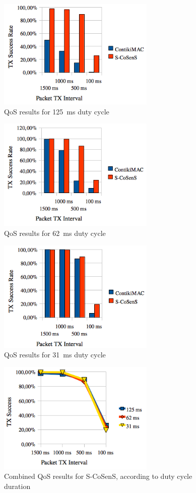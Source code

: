 \documentclass[a4paper,twoside]{article}
\begin{document}
\begin{figure}
  \centering
  \includegraphics[width=7.5cm]{graphes/QoS8Hz.png}
  \caption{QoS results for 125~ms duty cycle}
  \label{FigSuccessRate8Hz}
\end{figure}
\begin{figure}
  \centering
  \includegraphics[width=7.5cm]{graphes/QoS16Hz.png}
  \caption{QoS results for 62~ms duty cycle}
  \label{FigSuccessRate16Hz}
\end{figure}
\begin{figure}
  \centering
  \includegraphics[width=7.5cm]{graphes/QoS32Hz.png}
  \caption{QoS results for 31~ms duty cycle}
  \label{FigSuccessRate32Hz}
\end{figure}
\begin{figure}
  \centering
  \includegraphics[width=7.5cm]{graphes/QoSstabilitySCoSenS.png}
  \caption{Combined QoS results for S-CoSenS,
           according to duty cycle duration}
  \label{FigSuccessRateSCoSenS}
\end{figure}
\end{document}
